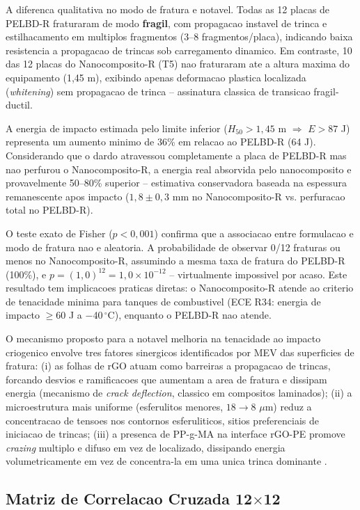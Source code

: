 \documentclass[11pt,a4paper,oneside]{article}
\begin{document}
A diferenca qualitativa no modo de fratura e notavel. Todas as 12 placas de PELBD-R fraturaram de modo {\bfseries fragil}, com propagacao instavel de trinca e estilhacamento em multiplos fragmentos (3--8 fragmentos/placa), indicando baixa resistencia a propagacao de trincas sob carregamento dinamico. Em contraste, 10 das 12 placas do Nanocomposito-R (T5) nao fraturaram ate a altura maxima do equipamento (1,45 m), exibindo apenas deformacao plastica localizada (\textit{whitening}) sem propagacao de trinca -- assinatura classica de transicao fragil-ductil.

A energia de impacto estimada pelo limite inferior ($H_{50}{>}1{,}45$ m $\Rightarrow$ $E{>}87$ J) representa um aumento minimo de 36\% em relacao ao PELBD-R (64 J). Considerando que o dardo atravessou completamente a placa de PELBD-R mas nao perfurou o Nanocomposito-R, a energia real absorvida pelo nanocomposito e provavelmente 50--80\% superior -- estimativa conservadora baseada na espessura remanescente apos impacto ($1{,}8{\pm}0{,}3$ mm no Nanocomposito-R vs. perfuracao total no PELBD-R).

O teste exato de Fisher ($p{<}0{,}001$) confirma que a associacao entre formulacao e modo de fratura nao e aleatoria. A probabilidade de observar 0/12 fraturas ou menos no Nanocomposito-R, assumindo a mesma taxa de fratura do PELBD-R (100\%), e $p{=}(1{,}0)^{12}{=}1{,}0{\times}10^{-12}$ -- virtualmente impossivel por acaso. Este resultado tem implicacoes praticas diretas: o Nanocomposito-R atende ao criterio de tenacidade minima para tanques de combustivel (ECE R34: energia de impacto $\ge60$ J a $-$40$\,^{\circ}$C), enquanto o PELBD-R nao atende.

O mecanismo proposto para a notavel melhoria na tenacidade ao impacto criogenico envolve tres fatores sinergicos identificados por MEV das superficies de fratura: (i) as folhas de rGO atuam como barreiras a propagacao de trincas, forcando desvios e ramificacoes que aumentam a area de fratura e dissipam energia (mecanismo de \textit{crack deflection}, classico em compositos laminados); (ii) a microestrutura mais uniforme (esferulitos menores, $18{\rightarrow}8$ $\mu$m) reduz a concentracao de tensoes nos contornos esferuliticos, sitios preferenciais de iniciacao de trincas; (iii) a presenca de PP-g-MA na interface rGO-PE promove \textit{crazing} multiplo e difuso em vez de localizado, dissipando energia volumetricamente em vez de concentra-la em uma unica trinca dominante \cite{Rafiee2010}.

\subsection{Matriz de Correlacao Cruzada 12$\times$12}\label{sec:heatmap}
\end{document}
